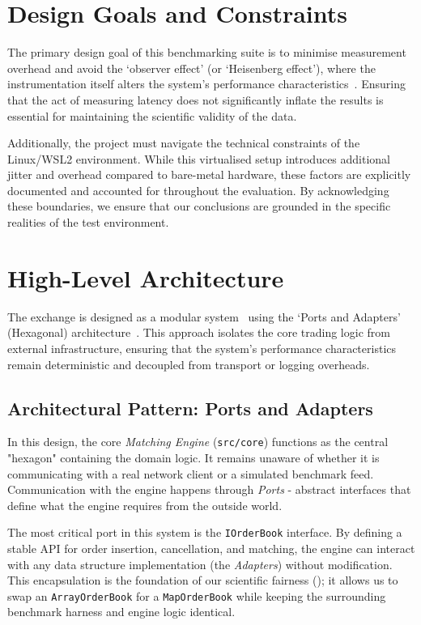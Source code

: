 \section{Design Goals and Constraints}
The primary design goal of this benchmarking suite is to minimise 
measurement overhead and avoid the `observer effect' (or `Heisenberg 
effect'), where the instrumentation itself alters the system's performance 
characteristics~\citep{gregg2013systems}. Ensuring that the act of 
measuring latency does not significantly inflate the results is essential 
for maintaining the scientific validity of the data.

Additionally, the project must navigate the technical constraints of the 
Linux/WSL2 environment. While this virtualised setup introduces 
additional jitter and overhead compared to bare-metal hardware, these 
factors are explicitly documented and accounted for throughout the 
evaluation. By acknowledging these boundaries, we ensure that our 
conclusions are grounded in the specific realities of the test 
environment.





\section{High-Level Architecture}
The exchange is designed as a modular system~\citep{parnas1972} using the `Ports and 
Adapters' (Hexagonal) architecture~\citep{velepucha2023hexagonal,cockburn_hexagonal}. This 
approach isolates the core trading logic from external infrastructure, 
ensuring that the system's performance characteristics remain 
deterministic and decoupled from transport or logging overheads.

\subsection{Architectural Pattern: Ports and Adapters}
In this design, the core \textit{Matching Engine} (\texttt{src/core}) 
functions as the central "hexagon" containing the domain logic. It remains 
unaware of whether it is communicating with a real network client or a 
simulated benchmark feed. Communication with the engine happens 
through \textit{Ports} - abstract interfaces that define what 
the engine requires from the outside world.

The most critical port in this system is the \texttt{IOrderBook} interface. 
By defining a stable API for order insertion, cancellation, and matching, 
the engine can interact with any data structure implementation (the 
\textit{Adapters}) without modification. This encapsulation is the 
foundation of our scientific fairness (); it allows us to swap 
an \texttt{ArrayOrderBook} for a \texttt{MapOrderBook} while keeping the 
surrounding benchmark harness and engine logic identical.

